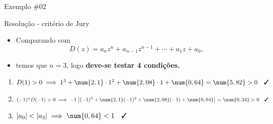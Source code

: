 \begin{frame}{Exemplo \#02}
\begin{block}{Resolução - critério de Jury}
\begin{itemize}
	\item Comparando com 
	$$D(z) = a_{n}z^{n}+a_{n-1}z^{n-1}+\cdots+a_{1}z+a_{0},$$
\end{itemize}
\begin{itemize}
    \item[] temos que $n=3$, logo \textbf{deve-se testar 4 condições.}
\end{itemize}
\begin{enumerate}[(1)]
	\item $D(1)>0 \implies 1^{3}+\num{2,1}\cdot1^{2}+\num{2,08}\cdot1+\num{0,64}=\num{5,82}>0 \quad \text{\cmark}$
	\item $(-1)^{n}D(-1)>0 \implies -1\left[ (-1)^{3}+\num{2,1}(-1)^{2}+\num{2,08}(-1)+\num{0,64} \right]=\num{0,34}>0 \quad \text{\cmark}$
	\item $|a_{0}|<|a_{3}| \implies \num{0,64} < 1 \quad \text{\cmark}$
\end{enumerate}
\end{block}
\end{frame}

